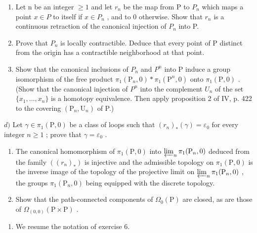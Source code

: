 \begin{enumerate}
\def\labelenumi{\alph{enumi})}
\item
  Let n be an integer \(\geqslant 1\) and let \(r_{n}\) be the map from P to \(P_{n}\) which maps a point \(x \in P\) to itself if \(x \in P_{n}\) , and to 0 otherwise. Show that \(r_{n}\) is a continuous retraction of the canonical injection of \(P_{n}\) into P.
\item
  Prove that \(P_{n}\) is locally contractible. Deduce that every point of P distinct from the origin has a contractible neighborhood at that point.
\item
  Show that the canonical inclusions of \(P_{n}\) and \(P^{n}\) into P induce a group isomorphism of the free product \(\pi_{1}(\mathrm{P}_{n},0)*\pi_{1}(\mathrm{P}^{n},0)\) onto \(\pi_{1}(\mathrm{P},0)\) . (Show that the canonical injection of \(P^{n}\) into the complement \(U_{n}\) of the set \(\{x_{1},\ldots,x_{n}\}\) is a homotopy equivalence. Then apply proposition 2 of IV, p. 422 to the covering \((\mathrm{P}_{n},\mathrm{U}_{n})\) of P.)
\end{enumerate}

\(d)\) Let \(\gamma \in \pi_1(\mathrm{P},0)\) be a class of loops such that \((r_n)_*(\gamma) = \varepsilon_0\) for every integer \(n \geqslant 1\) ; prove that \(\gamma = \varepsilon_0\) .

\begin{enumerate}
\def\labelenumi{\alph{enumi})}
\setcounter{enumi}{4}
\item
  The canonical homomorphism of \(\pi_1(\mathrm{P},0)\) into \(\varprojlim_{n}\pi_{1}(\mathrm{P}_{n},0)\) deduced from the family \(((r_n)_*)\) is injective and the admissible topology on \(\pi_1(\mathrm{P},0)\) is the inverse image of the topology of the projective limit on \(\varprojlim_{n}\pi_{1}(\mathrm{P}_{n},0)\) , the groups \(\pi_1(\mathrm{P}_n,0)\) being equipped with the discrete topology.
\item
  Show that the path-connected components of \(\Omega_{0}(\mathrm{P})\) are closed, as are those of \(\Omega_{(0,0)}(\mathrm{P} \times \mathrm{P})\) .
\end{enumerate}

\begin{enumerate}
\def\labelenumi{\arabic{enumi})}
\setcounter{enumi}{6}
\tightlist
\item
  We resume the notation of exercise 6.
\end{enumerate}

